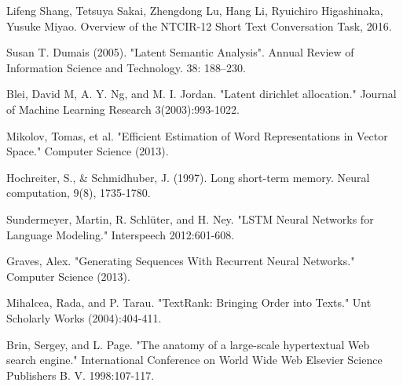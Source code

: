 \documentclass{sig-alternate}
\begin{document}
%
%
\begin{thebibliography}{5}

Lifeng Shang, Tetsuya Sakai, Zhengdong Lu, Hang Li, Ryuichiro Higashinaka, Yusuke Miyao. 
Overview of the NTCIR-12 Short Text Conversation Task, 2016.

Susan T. Dumais (2005). "Latent Semantic Analysis". Annual Review of Information Science and Technology. 38: 188–230. 

Blei, David M, A. Y. Ng, and M. I. Jordan. "Latent dirichlet allocation." Journal of Machine Learning Research 3(2003):993-1022.

Mikolov, Tomas, et al. "Efficient Estimation of Word Representations in Vector Space." Computer Science (2013).

Hochreiter, S., \& Schmidhuber, J. (1997). Long short-term memory. Neural computation, 9(8), 1735-1780.

Sundermeyer, Martin, R. Schlüter, and H. Ney. "LSTM Neural Networks for Language Modeling." Interspeech 2012:601-608.

Graves, Alex. "Generating Sequences With Recurrent Neural Networks." Computer Science (2013).

Mihalcea, Rada, and P. Tarau. "TextRank: Bringing Order into Texts." Unt Scholarly Works (2004):404-411.

Brin, Sergey, and L. Page. "The anatomy of a large-scale hypertextual Web search engine." International Conference on World Wide Web Elsevier Science Publishers B. V. 1998:107-117.


\end{thebibliography}
\end{document}
